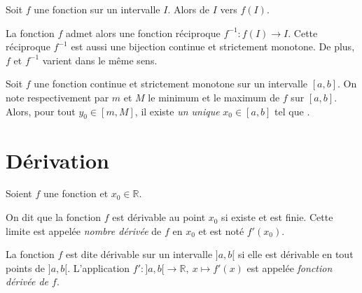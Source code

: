       \begin{prop}
            Soit $f$ une fonction  sur un intervalle $I$. \linebreak
            Alors  de $I$ vers $f(I)$.
            
            La fonction $f$ admet alors une fonction r\'eciproque $f^{-1} : f(I) \rightarrow I$.
            Cette r\'eciproque $f^{-1}$ est aussi une bijection continue et strictement monotone.
            De plus, $f$ et $f^{-1}$ varient dans le m\^eme sens.
      \end{prop}

      \begin{cor}
            Soit $f$ une fonction continue et strictement monotone sur un intervalle $[a,b]$.
            On note respectivement par $m$ et $M$ le minimum et le maximum de $f$ sur $[a,b]$.
            Alors, pour tout $y_0\in[m,M]$, il existe \emph{un unique} $x_0\in[a,b]$ tel que .
      \end{cor}

\section{D\'erivation}
      \begin{defi}[D\'erivabilit\'e]
            Soient $f$ une fonction et $x_0 \in \mathbb{R}$.
            
            On dit que la fonction $f$ est d\'erivable au point $x_0$ si 
            existe et est finie.
            Cette limite est appel\'ee \emph{nombre d\'eriv\'ee} de $f$ en $x_0$ et est not\'e \emph{$f'(x_0)$}.
            
            La fonction $f$ est dite d\'erivable sur un intervalle $]a,b[$ si elle est d\'erivable en tout points de $]a,b[$.
            L'application $f' : ]a,b[ \rightarrow \mathbb{R} , \ x \mapsto f'(x)$ est appel\'ee 
            \emph{fonction d\'eriv\'ee de $f$}.
            
      \end{defi}
      
